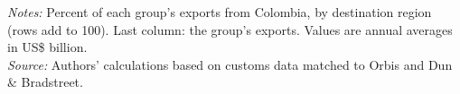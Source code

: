 \documentclass[11pt,a4paper]{article}
\begin{document}
\begin{table}[H]\centering\small%
  \caption{Colombia, Other Goods: Multinational Exports by Parent Region and Destination Region}%
  \label{tab:c_reg_COL_rest}%
  \par\vspace{3pt}%
  \begin{minipage}{0.95\textwidth}\footnotesize %
  \textit{Notes:} Percent of each group's exports from Colombia, by destination region (rows add to 100). Last column: the group's exports. Values are annual averages in US\$ billion.\\[3pt]%
  \textit{Source:} Authors' calculations based on customs data matched to Orbis and Dun \& Bradstreet.%
  \end{minipage}%
  \end{table}
\end{document}
